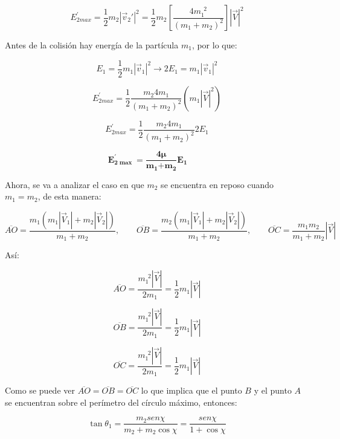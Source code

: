 \documentclass[]{article}
\begin{document}
\[E_{2max}^{'} = \frac{1}{2}m_{2}\left| {\overrightarrow{v}}_{2}' \right|^{2} = \frac{1}{2}m_{2}\left\lbrack \frac{4m_{1}^{\ \ 2}}{\left( m_{1} + m_{2} \right)^{2}} \right\rbrack\left| \overrightarrow{V} \right|^{2}\]

Antes de la colisión hay energía de la partícula \(m_{1}\), por lo que:

\[E_{1} = \frac{1}{2}m_{1}\left| {\overrightarrow{v}}_{1} \right|^{2} \rightarrow 2E_{1} = m_{1}\left| {\overrightarrow{v}}_{1} \right|^{2}\]

\[E_{2max}^{'} = \frac{1}{2}\frac{m_{2}4m_{1}}{\left( m_{1} + m_{2} \right)^{2}}\left( m_{1}\left| \overrightarrow{V} \right|^{2} \right)\]

\[E_{2max}^{'} = \frac{1}{2}\frac{m_{2}4m_{1}}{\left( m_{1} + m_{2} \right)^{2}}2E_{1}\]

\[\mathbf{E}_{\mathbf{2}\mathbf{\max}}^{\mathbf{'}}\mathbf{=}\frac{\mathbf{4}\mathbf{\mu}}{\mathbf{m}_{\mathbf{1}}\mathbf{+}\mathbf{m}_{\mathbf{2}}}\mathbf{E}_{\mathbf{1}}\mathbf{\ \ \ \ \ \ \ \ \ \ }\]

Ahora, se va a analizar el caso en que \(m_{2}\) se encuentra en reposo
cuando \(m_{1} = m_{2}\), de esta manera:

\[\overline{AO} = \frac{m_{1}\left( m_{1}\left| {\overrightarrow{V}}_{1} \right| + m_{2}\left| {\overrightarrow{V}}_{2} \right| \right)}{m_{1} + m_{2}},\ \ \ \ \ \ \ \ \ \overline{OB} = \frac{m_{2}\left( m_{1}\left| {\overrightarrow{V}}_{1} \right| + m_{2}\left| {\overrightarrow{V}}_{2} \right| \right)}{m_{1} + m_{2}},\ \ \ \ \ \ \ \ \ \overline{OC} = \frac{m_{1}m_{2}}{m_{1} + m_{2}}\left| \overrightarrow{V} \right|\]

Así:

\[\overline{AO} = \frac{m_{1}^{\ \ 2}\left| \overrightarrow{V} \right|}{2m_{1}} = \frac{1}{2}m_{1}\left| \overrightarrow{V} \right|\]

\[\overline{OB} = \frac{m_{1}^{\ \ 2}\left| \overrightarrow{V} \right|}{2m_{1}} = \frac{1}{2}m_{1}\left| \overrightarrow{V} \right|\]

\[\overline{OC} = \frac{m_{1}^{\ \ 2}\left| \overrightarrow{V} \right|}{2m_{1}} = \frac{1}{2}m_{1}\left| \overrightarrow{V} \right|\]

Como se puede ver \(\overline{AO} = \overline{OB} = \overline{OC}\) lo
que implica que el punto \(B\) y el punto \(A\) se encuentran sobre el
perímetro del círculo máximo, entonces:

\[\tan\theta_{1} = \frac{m_{2}{sen}\chi}{m_{2} + m_{2}\cos\chi} = \frac{{sen}\chi}{1 + \cos\chi}\]
\end{document}
